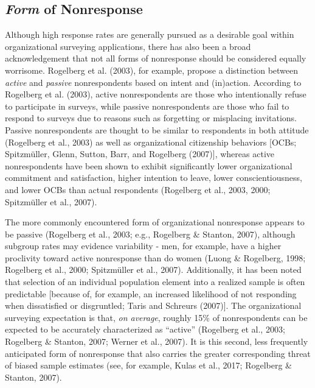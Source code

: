 \documentclass[
  ,man,floatsintext]{apa6}
\begin{document}
\hypertarget{form-of-nonresponse}{%
\subsection{\texorpdfstring{\emph{Form} of Nonresponse}{Form of Nonresponse}}\label{form-of-nonresponse}}

Although high response rates are generally pursued as a desirable goal within organizational surveying applications, there has also been a broad acknowledgement that not all forms of nonresponse should be considered equally worrisome. Rogelberg et al. (2003), for example, propose a distinction between \emph{active} and \emph{passive} nonrespondents based on intent and (in)action. According to Rogelberg et al. (2003), active nonrespondents are those who intentionally refuse to participate in surveys, while passive nonrespondents are those who fail to respond to surveys due to reasons such as forgetting or misplacing invitations. Passive nonrespondents are thought to be similar to respondents in both attitude (Rogelberg et al., 2003) as well as organizational citizenship behaviors {[}OCBs; Spitzmüller, Glenn, Sutton, Barr, and Rogelberg (2007){]}, whereas active nonrespondents have been shown to exhibit significantly lower organizational commitment and satisfaction, higher intention to leave, lower conscientiousness, and lower OCBs than actual respondents (Rogelberg et al., 2003, 2000; Spitzmüller et al., 2007).

The more commonly encountered form of organizational nonresponse appears to be passive (Rogelberg et al., 2003; e.g., Rogelberg \& Stanton, 2007), although subgroup rates may evidence variability - men, for example, have a higher proclivity toward active nonresponse than do women (Luong \& Rogelberg, 1998; Rogelberg et al., 2000; Spitzmüller et al., 2007). Additionally, it has been noted that selection of an individual population element into a realized sample is often predictable {[}because of, for example, an increased likelihood of not responding when dissatisfied or disgruntled; Taris and Schreurs (2007){]}. The organizational surveying expectation is that, \emph{on average}, roughly 15\% of nonrespondents can be expected to be accurately characterized as ``active'' (Rogelberg et al., 2003; Rogelberg \& Stanton, 2007; Werner et al., 2007). It is this second, less frequently anticipated form of nonresponse that also carries the greater corresponding threat of biased sample estimates (see, for example, Kulas et al., 2017; Rogelberg \& Stanton, 2007).
\end{document}
